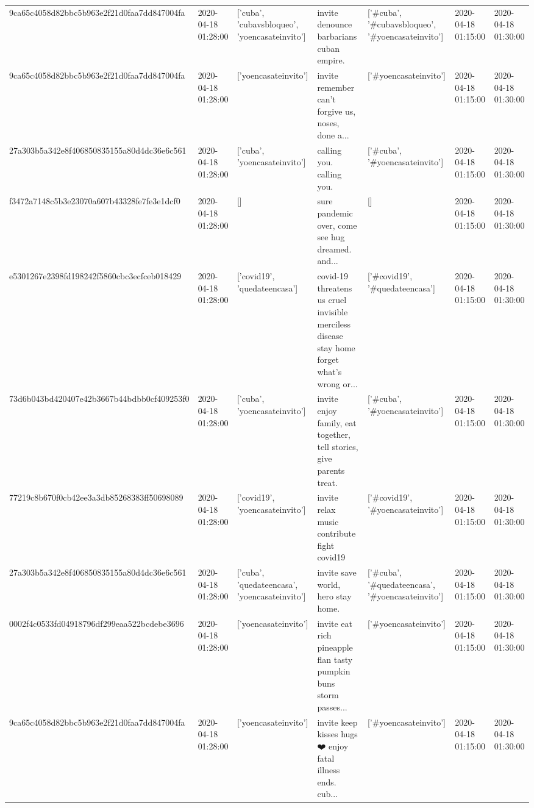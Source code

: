 \begin{tabular}{lllllll}
9ca65c4058d82bbc5b963e2f21d0faa7dd847004fa & 2020-04-18 01:28:00 & ['cuba', 'cubavsbloqueo', 'yoencasateinvito'] & invite denounce barbarians cuban empire. & ['#cuba', '#cubavsbloqueo', '#yoencasateinvito'] & 2020-04-18 01:15:00 & 2020-04-18 01:30:00 \\
9ca65c4058d82bbc5b963e2f21d0faa7dd847004fa & 2020-04-18 01:28:00 & ['yoencasateinvito'] & invite remember can't forgive us, noses, done a... & ['#yoencasateinvito'] & 2020-04-18 01:15:00 & 2020-04-18 01:30:00 \\
27a303b5a342e8f406850835155a80d4dc36e6c561 & 2020-04-18 01:28:00 & ['cuba', 'yoencasateinvito'] & calling you. calling you. & ['#cuba', '#yoencasateinvito'] & 2020-04-18 01:15:00 & 2020-04-18 01:30:00 \\
f3472a7148c5b3e23070a607b43328fe7fe3e1dcf0 & 2020-04-18 01:28:00 & [] & sure pandemic over, come see hug dreamed. and... & [] & 2020-04-18 01:15:00 & 2020-04-18 01:30:00 \\
e5301267e2398fd198242f5860cbc3ecfceb018429 & 2020-04-18 01:28:00 & ['covid19', 'quedateencasa'] & covid-19 threatens us cruel invisible merciless disease stay home forget what's wrong or... & ['#covid19', '#quedateencasa'] & 2020-04-18 01:15:00 & 2020-04-18 01:30:00 \\
73d6b043bd420407e42b3667b44bdbb0cf409253f0 & 2020-04-18 01:28:00 & ['cuba', 'yoencasateinvito'] & invite enjoy family, eat together, tell stories, give parents treat. & ['#cuba', '#yoencasateinvito'] & 2020-04-18 01:15:00 & 2020-04-18 01:30:00 \\
77219c8b670f0cb42ee3a3db85268383ff50698089 & 2020-04-18 01:28:00 & ['covid19', 'yoencasateinvito'] & invite relax music contribute fight covid19 & ['#covid19', '#yoencasateinvito'] & 2020-04-18 01:15:00 & 2020-04-18 01:30:00 \\
27a303b5a342e8f406850835155a80d4dc36e6c561 & 2020-04-18 01:28:00 & ['cuba', 'quedateencasa', 'yoencasateinvito'] & invite save world, hero stay home. & ['#cuba', '#quedateencasa', '#yoencasateinvito'] & 2020-04-18 01:15:00 & 2020-04-18 01:30:00 \\
0002f4c0533fd04918796df299eaa522bcdebe3696 & 2020-04-18 01:28:00 & ['yoencasateinvito'] & invite eat rich pineapple flan tasty pumpkin buns storm passes... & ['#yoencasateinvito'] & 2020-04-18 01:15:00 & 2020-04-18 01:30:00 \\
9ca65c4058d82bbc5b963e2f21d0faa7dd847004fa & 2020-04-18 01:28:00 & ['yoencasateinvito'] & invite keep kisses hugs ❤️ enjoy fatal illness ends. cub... & ['#yoencasateinvito'] & 2020-04-18 01:15:00 & 2020-04-18 01:30:00 \\

\end{tabular}
